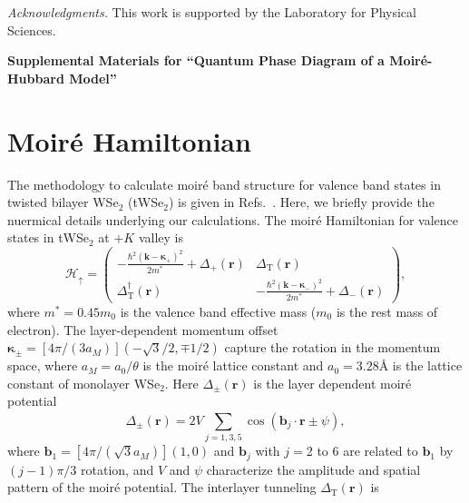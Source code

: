 \documentclass[aps,prl,floatfix,twocolumn]{revtex4-1}
\begin{document}
\textit{Acknowledgments.} This work is supported by the Laboratory for Physical Sciences.






\clearpage
\setcounter{figure}{0}
\setcounter{equation}{0}
\renewcommand{\theequation}{S\arabic{equation}}
\renewcommand{\thefigure}{S\arabic{figure}}
\renewcommand{\thesection}{S\arabic{section}}

\onecolumngrid
\begin{center}
		\textbf{Supplemental Materials for ``Quantum Phase Diagram of a Moir\'e-Hubbard Model''}
\end{center}

\twocolumngrid

\section{Moir\'e Hamiltonian}
The methodology to calculate moir\'e band structure for valence band states in twisted bilayer WSe$_2$ (tWSe$_2$) is given in Refs.~. Here, we briefly provide the nuermical details underlying our calculations. The moir\'e Hamiltonian for valence states in tWSe$_2$  at  $  +K $ valley is 
\begin{equation}\label{eq:Hmoire}
	\mathcal{H}_\uparrow=\begin{pmatrix}
		-\frac{\hbar^2 (\bm{k}-\bm{\kappa}_+)^2}{2m^*}+\Delta_{+}(\bm{r}) & \Delta_{\text{T}}(\bm{r})\\
		\Delta_{\text{T}}^\dagger(\bm{r}) & -\frac{\hbar^2(\bm{k}-\bm{\kappa}_-)^2}{2m^*}+\Delta_{-}(\bm{r})
	\end{pmatrix},
\end{equation}
where $ m^*=0.45m_0 $ is the valence band effective mass ($ m_0 $ is the rest mass of electron). The layer-dependent momentum offset $\bm{\kappa}_{\pm}=[4\pi/(3a_M)](-\sqrt{3}/2,\mp 1/2)$ capture the rotation in the momentum space, where $ a_M=a_0/\theta $ is the moir\'e lattice constant and $ a_0=3.28 $\AA{} is the lattice constant of monolayer WSe$ _{2} $. Here $\Delta_{\pm}(\bm{r})$ is the layer dependent moir\'e potential
\begin{equation}
	\Delta_{\pm}(\bm{r}) = 2 V \sum_{j=1,3,5}^{}\cos(\bm{b}_j\cdot \bm{r} \pm \psi),
\end{equation}
where $ \bm{b}_1=[4\pi/(\sqrt{3}a_M)](1,0)$ and $\bm{b}_j$ with $j=$2 to 6 are related to $\bm{b}_1$ by $(j-1)\pi/3$ rotation, and $ V $ and $ \psi $ characterize the amplitude and spatial pattern of the moir\'e potential. The interlayer tunneling $\Delta_{\text{T}}(\bm{r})$ is 
\end{document}
